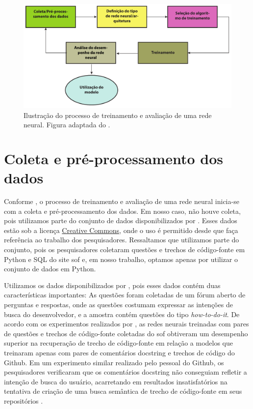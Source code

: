 \begin{figure}[H]
\centering
\includegraphics[width=1\textwidth]{figuras/cap-experimento/neural_network_training_lifecycle_dissertation.pdf}
\caption{Ilustração do processo de treinamento e avaliação de uma rede neural. Figura adaptada do \cite{nndesign:2014:pratical-training-issues}.} 
\label{fig:training-neural-network-cyclic}
\end{figure}

\section{Coleta e pré-processamento dos dados}
\label{sec:coleta-pre-processamento-dos-dados}

Conforme \cite{nndesign:2014:pratical-training-issues}, o processo de treinamento e avaliação de uma rede neural inicia-se com a coleta e pré-processamento dos dados. Em nosso caso, não houve coleta, pois utilizamos parte do conjunto de dados disponibilizados por \cite{yao-2018}. Esses dados estão sob a licença \href{https://creativecommons.org/licenses/by/4.0/}{Creative Commons}, onde o uso é permitido desde que faça referência ao trabalho dos pesquisadores. Ressaltamos que utilizamos parte do conjunto, pois os pesquisadores coletaram questões e trechos de código-fonte em Python e SQL do site \Gls{sof} e, em nosso trabalho, optamos apenas por utilizar o conjunto de dados em Python. 


Utilizamos os dados disponibilizados por \cite{yao-2018}, pois esses dados contém duas características importantes: As questões foram coletadas de um fórum aberto de perguntas e respostas, onde as questões costumam expressar as intenções de busca do desenvolvedor, e a amostra contém questões do tipo \textit{how-to-do-it}. De acordo com os experimentos realizados por \cite{cambronero-deep-learning-code-search:2019}, as redes neurais treinadas com pares de questões e trechos de código-fonte coletadas do \Gls{sof} obtiveram um desempenho superior na recuperação de trecho de código-fonte em relação a modelos que treinaram apenas com pares de comentários \gls{docstring} e trechos de código do Github. Em um experimento similar realizado pelo pessoal do Github, os pesquisadores verificaram que os comentários \gls{docstring} não conseguiam refletir a intenção de busca do usuário, acarretando em resultados insatisfatórios na tentativa de criação de uma busca semântica de trecho de código-fonte em seus repositórios \citep{husain-github-semantic-search-code-2019}.

